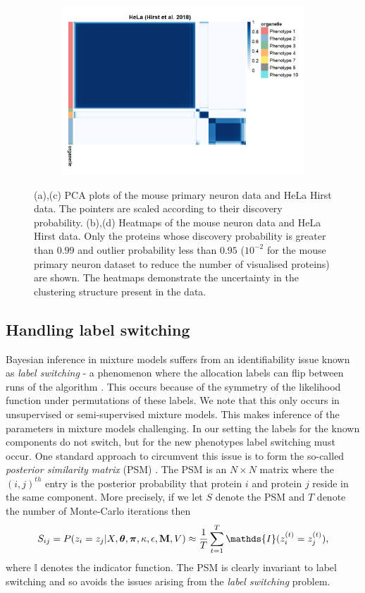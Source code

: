 \documentclass[12pt,english]{article}
\begin{document}
\begin{figure}
\begin{subfigure}[t]{0.5\textwidth}
	\centering
	\includegraphics[height=2.5in]{heatmapHirst.jpeg}
	\caption{}
\end{subfigure}
	\caption{(a),(c) PCA plots of the mouse primary neuron data and HeLa Hirst data. The pointers are scaled according to their discovery probability. (b),(d) Heatmaps of the mouse neuron data and HeLa Hirst data. Only the proteins whose discovery probability is greater than $0.99$ and outlier probability less than $0.95$ ($10^{-2}$ for the mouse primary neuron dataset to reduce the number of visualised proteins) are shown. The heatmaps demonstrate the uncertainty in the clustering structure present in the data.}
\end{figure}




\subsection{Handling label switching}
Bayesian inference in mixture models suffers from an identifiability issue known as \textit{label switching} - a phenomenon where the allocation labels can flip between runs of the algorithm \citep{Richardson::1997, Stephens:2000}. This occurs because of the symmetry of the likelihood function under permutations of these labels. We note that this only occurs in unsupervised or semi-supervised mixture models. This makes inference of the parameters in mixture models challenging. In our setting the labels for the known components do not switch, but for the new phenotypes label switching must occur. One standard approach to circumvent this issue is to form the so-called \textit{posterior similarity matrix} (PSM) \citep{fritsch::2009}. The PSM is an $N\times N$ matrix where the $(i,j)^{th}$ entry is the posterior probability that protein $i$ and protein $j$ reside in the same component. More precisely, if we let $S$ denote the PSM and $T$ denote the number of Monte-Carlo iterations then 
\begin{equation}
S_{ij} = P(z_i = z_j| X, \boldsymbol{\theta}, \boldsymbol{\pi} , \kappa, \epsilon, {\bf M}, V) \approx \frac{1}{T} \sum_{t = 1}^{T} \mathds{I}(z^{(t)}_i = z^{(t)}_j),
\end{equation}
where $\mathds{I}$ denotes the indicator function. The PSM is clearly invariant to label switching and so avoids the issues arising from the \textit{label switching} problem. 
\end{document}
